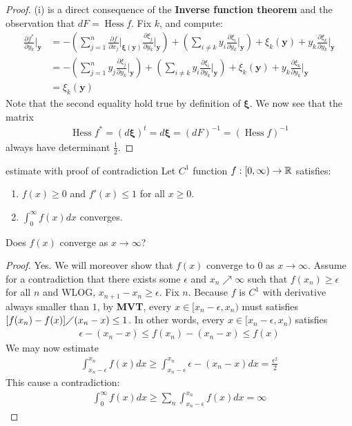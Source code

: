 \documentclass{report}
\begin{document}
\begin{proof}
  (i) is a direct consequence of the \textbf{Inverse function theorem} and the observation that $dF=\operatorname{Hess}f$. Fix $k$, and compute:   
\begin{align*}
\frac{\partial f^*}{\partial y_k}\Bigg|_\textbf{y}&= - \left(\sum_{j=1}^n \frac{\partial f}{\partial x_j}\Bigg|_{\boldsymbol{\xi}(\textbf{y})} \frac{\partial \xi_j}{\partial y_k}\Bigg|_{\textbf{y}} \right)+ \left(\sum_{i \neq k} y_i \frac{\partial \xi_i}{\partial y_k} \Bigg|_\textbf{y} \right) + \xi_k(\textbf{y}) +y_k \frac{\partial \xi_k}{\partial y_k}\Bigg|_{\textbf{y}}\\
&= - \left(\sum_{j=1}^n y_j \frac{\partial \xi_j}{\partial y_k}\Bigg|_{\textbf{y}} \right)+ \left(\sum_{i \neq k} y_i \frac{\partial \xi_i}{\partial y_k} \Bigg|_\textbf{y} \right) + \xi_k(\textbf{y}) +y_k \frac{\partial \xi_k}{\partial y_k}\Bigg|_{\textbf{y}} \\
&= \xi_k (\textbf{y})
\end{align*}
Note that the second equality hold true by definition of $\boldsymbol{\xi}$. We now see  that the matrix 
\begin{align*}
\operatorname{Hess}f^*= (d\boldsymbol{\xi})^t=d\boldsymbol{\xi}=(dF)^{-1}=(\operatorname{Hess}f)^{-1}
\end{align*}
always have determinant $\frac{1}{2}$. 
\end{proof}
\begin{question}{estimate with proof of contradiction}{}
Let $C^1$ function $f:[0,\infty)\rightarrow \mathbb{R}$ satisfies: 
\begin{enumerate}[label=(\roman*)]
  \item $f(x)\geq 0$ and $f'(x)\leq 1$ for all $x \geq 0$. 
  \item $\int_0^{\infty}f(x)dx$ converges. 
\end{enumerate}
Does $f(x)$ converge as $x \rightarrow \infty$?   
\end{question}
\begin{proof}
  Yes. We will moreover show that $f(x)$ converge to $0$ as  $x\rightarrow \infty$. Assume for a contradiction that there exists some $\epsilon $ and $x_n\nearrow \infty$ such that $f(x_n)\geq  \epsilon $ for all $n$ and WLOG, $x_{n+1}-x_n \geq \epsilon $.  Fix $n$. Because $f$ is $C^1$ with derivative always smaller than $1$, by \textbf{MVT}, every $x \in [x_n-\epsilon ,x_n)$ must satisfies $[f(x_n)-f(x)]\diagup (x_n-x)\leq 1$. In other words, every $x \in [x_n-\epsilon ,x_n)$ satisfies 
\begin{align*}
\epsilon - (x_n-x)\leq f(x_n)-(x_n-x)\leq f(x)  
\end{align*}
We may now estimate 
\begin{align*}
  \int_{x_n-\epsilon }^{x_n} f(x)dx  \geq \int_{x_n-\epsilon }^{x_n} \epsilon - (x_n-x)dx =  \frac{\epsilon ^2}{2}
\end{align*}
This cause a contradiction: 
\begin{align*}
\int_0^{\infty} f(x)dx \geq \sum_n \int_{x_n-\epsilon }^{x_n}f(x)dx =\infty
\end{align*}
\end{proof}
\end{document}
